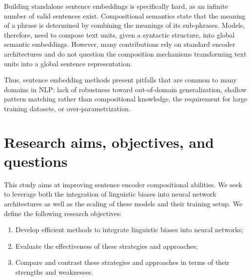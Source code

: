 Building standalone sentence embeddings is specifically hard, as an infinite number of valid sentences exist. Compositional semantics state that the meaning of a phrase is determined by combining the meanings of its sub-phrases. Models, therefore, need to compose text units, given a syntactic structure, into global semantic embeddings. However, many contributions rely on standard encoder architectures and do not question the composition mechanisms transforming text units into a global sentence representation.

Thus, sentence embedding methods present pitfalls that are common to many domains in NLP: lack of robustness toward out-of-domain generalization, shallow pattern matching rather than compositional knowledge, the requirement for large training datasets, or over-parametrization. 

\section{Research aims, objectives, and questions}

This study aims at improving sentence encoder compositional abilities. We seek to leverage both the integration of linguistic biases into neural network architectures as well as the scaling of these models and their training setup.
We define the following research objectives:

\begin{enumerate}
    \item Develop efficient methods to integrate linguistic biases into neural networks;
    \item Evaluate the effectiveness of these strategies and approaches;
    \item Compare and contrast these strategies and approaches in terms of their strengths and weaknesses.
\end{enumerate}


